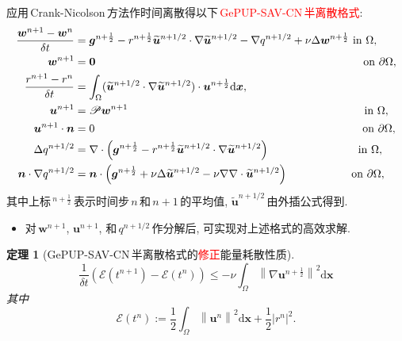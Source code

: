 \documentclass{beamer}
\newcommand{\dif}{\mathrm{d}}
\newtheorem{thm}{{定理}}
\begin{document}
\begin{CJK*}{UTF8}{gkai}
  \begin{frame}
    应用\,Crank-Nicolson\,方法作时间离散得以下\,\textcolor{red}{GePUP-SAV-CN\,半离散格式}:
    \begin{align*}
      \frac{\bm{w}^{n+1}-\bm{w}^n}{\delta t} &= \bm{g}^{n+\frac{1}{2}}-r^{n+\frac{1}{2}}\widetilde{\bm{u}}^{n+1/2}\cdot\nabla \widetilde{\bm{u}}^{n+1/2}-\nabla q^{n+1/2}+\nu\Delta \bm{w}^{n+\frac{1}{2}} \text{ in } \Omega, \\
      \bm{w}^{n+1} &= \bm{0} \hspace{84mm}\text{ on } \partial\Omega, \\
      \frac{r^{n+1}-r^n}{\delta t} &= \int_{\Omega}(\widetilde{\bm{u}}^{n+1/2}\cdot\nabla \widetilde{\bm{u}}^{n+1/2})\cdot \bm{u}^{n+\frac{1}{2}}\dif \bm{x}, \\
      \bm{u}^{n+1} &= \mathscr{P}\bm{w}^{n+1} \hspace{74mm}\text{ in } \Omega, \\
      \bm{u}^{n+1}\cdot \bm{n} &= 0 \hspace{84mm}\text{ on } \partial\Omega, \\
      \Delta q^{n+1/2} &= \nabla\cdot \left(\bm{g}^{n+\frac{1}{2}}-r^{n+\frac{1}{2}}\widetilde{\bm{u}}^{n+1/2}\cdot\nabla \widetilde{\bm{u}}^{n+1/2}\right) \hspace{27mm}\text{ in } \Omega, \\
      \bm{n}\cdot \nabla q^{n+1/2} &= \bm{n}\cdot\left(\bm{g}^{n+\frac{1}{2}}+\nu\Delta \widetilde{\bm{u}}^{n+1/2}-\nu\nabla\nabla\cdot \widetilde{\bm{u}}^{n+1/2}\right) \hspace{19mm}\text{ on } \partial\Omega,
    \end{align*}
    其中上标\,$^{n+\frac{1}{2}}$\,表示时间步\,$n$\,和\,$n+1$\,的平均值,
    $\widetilde{\bm{u}}^{n+1/2}$\,由外插公式得到.

    \begin{itemize}
    \item
      对\,$\bm{w}^{n+1}$, $\bm{u}^{n+1}$, 和\,$q^{n+1/2}$\,作分解后,
      可实现对上述格式的高效求解.
    \end{itemize}
  \end{frame}

  \begin{frame}
    \begin{thm}[GePUP-SAV-CN\,半离散格式的\textcolor{red}{修正}能量耗散性质]
      \begin{equation}
        \frac{1}{\delta t}\left( \mathcal{E}\left( t^{n+1} \right)-\mathcal{E}\left( t^n \right) \right) \le -\nu\int_{\Omega}\left\|\nabla\bm{u}^{n+\frac{1}{2}}\right\|^2\dif \bm{x}
      \end{equation}
      其中
      \begin{equation}
        \mathcal{E}\left( t^n \right) := \frac{1}{2}\int_{\Omega}\left\|\bm{u}^n\right\|^2\dif \bm{x}+\frac{1}{2}\left|r^n\right|^2.
      \end{equation}
    \end{thm}


\end{frame}
\end{CJK*}
\end{document}

